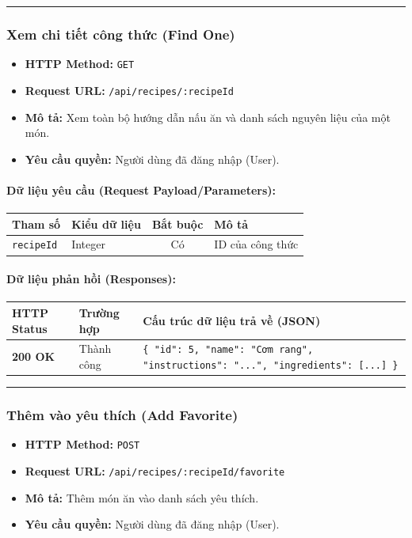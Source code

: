\documentclass[12pt,a4paper]{article}
\begin{document}
\vskip 0.4cm
\noindent\rule{\textwidth}{0.3pt}
\vskip 0.4cm

\subsubsection{Xem chi tiết công thức (Find One)}
\begin{itemize}[leftmargin=*]
    \item \textbf{HTTP Method:} \texttt{GET}
    \item \textbf{Request URL:} \texttt{/api/recipes/:recipeId}
    \item \textbf{Mô tả:} Xem toàn bộ hướng dẫn nấu ăn và danh sách nguyên liệu của một món.
    \item \textbf{Yêu cầu quyền:} Người dùng đã đăng nhập (User).
\end{itemize}

\paragraph{Dữ liệu yêu cầu (Request Payload/Parameters):}
\begin{longtable}{|p{2.8cm}|p{2.2cm}|c|p{7.0cm}|}
\hline
\textbf{Tham số} & \textbf{Kiểu dữ liệu} & \textbf{Bắt buộc} & \textbf{Mô tả} \\ \hline
\endhead
\texttt{recipeId} & Integer & Có & ID của công thức \\ \hline
\end{longtable}

\paragraph{Dữ liệu phản hồi (Responses):}
\begin{longtable}{|p{2.8cm}|p{3.2cm}|p{8.0cm}|}
\hline
\textbf{HTTP Status} & \textbf{Trường hợp} & \textbf{Cấu trúc dữ liệu trả về (JSON)} \\ \hline
\endhead
\textbf{200 OK} & Thành công & \texttt{\{ "id": 5, "name": "Cơm rang", "instructions": "...", "ingredients": [...] \}} \\ \hline
\end{longtable}

\vskip 0.4cm
\noindent\rule{\textwidth}{0.3pt}
\vskip 0.4cm

\subsubsection{Thêm vào yêu thích (Add Favorite)}
\begin{itemize}[leftmargin=*]
    \item \textbf{HTTP Method:} \texttt{POST}
    \item \textbf{Request URL:} \texttt{/api/recipes/:recipeId/favorite}
    \item \textbf{Mô tả:} Thêm món ăn vào danh sách yêu thích.
    \item \textbf{Yêu cầu quyền:} Người dùng đã đăng nhập (User).
\end{itemize}
\end{document}
